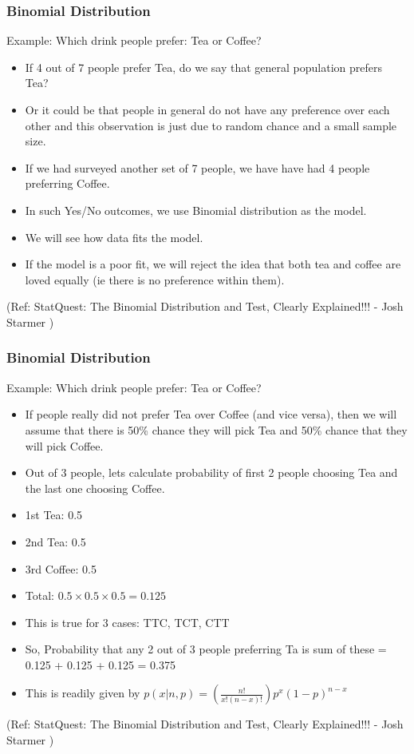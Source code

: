 \begin{frame}[fragile]\frametitle{Binomial Distribution}
Example: Which drink people prefer: Tea or Coffee?


	\begin{itemize}
	\item If 4 out of 7 people prefer Tea, do we say that general population prefers Tea?
	\item Or it could be that people in general do not have any preference over each other and this observation is just due to random chance and a small sample size.
	\item If we had surveyed another set of 7 people, we have have had 4 people preferring Coffee.
	\item In such Yes/No outcomes, we use Binomial distribution as the model.
	\item We will see how data fits the model.
	\item If the model is a poor fit, we will reject the idea that both tea and coffee are loved equally (ie there is no preference within them).
	\end{itemize}



  
\tiny{(Ref: StatQuest: The Binomial Distribution and Test, Clearly Explained!!! - Josh Starmer )}
\end{frame}

\begin{frame}[fragile]\frametitle{Binomial Distribution}
Example: Which drink people prefer: Tea or Coffee?


	\begin{itemize}
	\item If people really did not prefer Tea over Coffee (and vice versa), then we will assume that there is 50\% chance they will pick Tea and 50\% chance that they will pick Coffee.
	\item Out of 3 people, lets calculate probability of first 2 people choosing Tea and the last one choosing Coffee.
	\item 1st Tea: 0.5
	\item 2nd Tea: 0.5
	\item 3rd Coffee: 0.5
	\item Total: $0.5 \times 0.5 \times 0.5 = 0.125$ 
	\item This is true for 3 cases: TTC, TCT, CTT
	\item So, Probability that any 2 out of 3 people preferring Ta is sum of these = 0.125 + 0.125 + 0.125 = 0.375
	\item This is readily given by $p(x|n,p) = (\frac{n!}{x!(n-x)!})p^x(1-p)^{n-x}$
	\end{itemize}

 
\tiny{(Ref: StatQuest: The Binomial Distribution and Test, Clearly Explained!!! - Josh Starmer )}
\end{frame}

